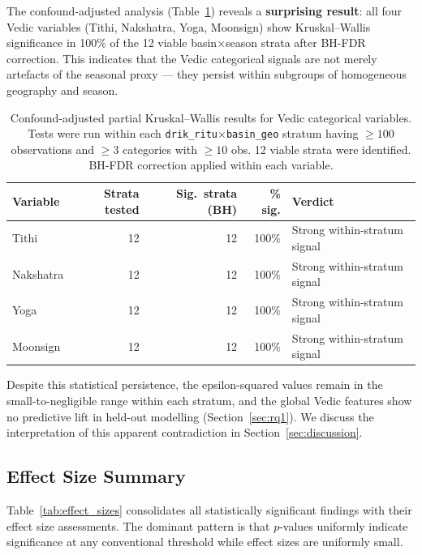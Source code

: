 \documentclass[12pt,a4paper]{article}
\begin{document}
The confound-adjusted analysis (Table~\ref{tab:confound}) reveals a
\textbf{surprising result}: all four Vedic variables (Tithi, Nakshatra, Yoga,
Moonsign) show Kruskal--Wallis significance in 100\% of the 12 viable
basin$\times$season strata after BH-FDR correction.
This indicates that the Vedic categorical signals are not merely artefacts of
the seasonal proxy — they persist within subgroups of homogeneous geography and
season.

\begin{table}[H]
  \centering
  \caption{Confound-adjusted partial Kruskal--Wallis results for Vedic
           categorical variables. Tests were run within each
           \texttt{drik\_ritu}$\times$\texttt{basin\_geo} stratum having
           $\geq 100$ observations and $\geq 3$ categories with $\geq 10$ obs.
           12 viable strata were identified. BH-FDR correction applied within
           each variable.}
  \label{tab:confound}
  \begin{tabular}{lrrrp{5cm}}
    \toprule
    \textbf{Variable} & \textbf{Strata tested} & \textbf{Sig.\ strata (BH)}
    & \textbf{\% sig.} & \textbf{Verdict} \\
    \midrule
    Tithi      & 12 & 12 & 100\% & Strong within-stratum signal \\
    Nakshatra  & 12 & 12 & 100\% & Strong within-stratum signal \\
    Yoga       & 12 & 12 & 100\% & Strong within-stratum signal \\
    Moonsign   & 12 & 12 & 100\% & Strong within-stratum signal \\
    \bottomrule
  \end{tabular}
\end{table}

Despite this statistical persistence, the epsilon-squared values remain in the
small-to-negligible range within each stratum, and the global Vedic features
show no predictive lift in held-out modelling (Section~\ref{sec:rq1}).
We discuss the interpretation of this apparent contradiction in
Section~\ref{sec:discussion}.

\subsection{Effect Size Summary}
\label{sec:effect_sizes}

Table~\ref{tab:effect_sizes} consolidates all statistically significant findings
with their effect size assessments.
The dominant pattern is that $p$-values uniformly indicate significance at any
conventional threshold while effect sizes are uniformly small.
\end{document}
